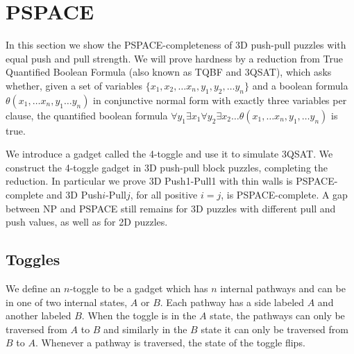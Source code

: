 \section{PSPACE}
\label{3DPSPACE}
In this section we show the PSPACE-completeness of 3D push-pull puzzles with equal push and pull strength. We will prove hardness by a reduction from True Quantified Boolean Formula (also known as TQBF and 3QSAT), which asks whether, given a set of variables $\{x_1, x_2, \ldots x_n, y_1, y_2, \ldots y_n\}$ and a boolean formula $\theta(x_1, \ldots x_n, y_1 \ldots y_n)$ in conjunctive normal form with exactly three variables per clause, the quantified boolean formula $\forall y_1 \exists x_1 \forall y_2 \exists x_2 \ldots \theta(x_1, \ldots x_n, y_1, \ldots y_n)$ is true.%

We introduce a gadget called the 4-toggle and use it to simulate 3QSAT\cite{NPBook}. We construct the 4-toggle gadget in 3D push-pull block puzzles, completing the reduction. In particular we prove 3D Push1-Pull1 with thin walls is PSPACE-complete and 3D Push$i$-Pull$j$, for all positive $i=j$, is PSPACE-complete. A gap between NP and PSPACE still remains for 3D puzzles with different pull and push values, as well as for 2D puzzles. 


\subsection{Toggles}
We define an $n$-toggle to be a gadget which has $n$ internal pathways and can be in one of two internal states, $A$ or $B$. Each pathway has a side labeled $A$ and another labeled $B$. When the toggle is in the $A$ state, the pathways can only be traversed from $A$ to $B$ and similarly in the $B$ state it can only be traversed from $B$ to $A$. Whenever a pathway is traversed, the state of the toggle flips.


